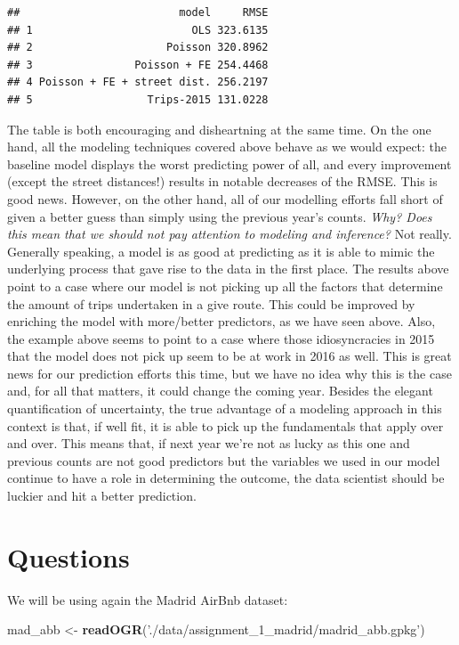 \documentclass[
]{book}
\newenvironment{Shaded}{\begin{snugshade}}{\end{snugshade}}
\newcommand{\KeywordTok}[1]{\textcolor[rgb]{0.13,0.29,0.53}{\textbf{#1}}}
\newcommand{\NormalTok}[1]{#1}
\newcommand{\StringTok}[1]{\textcolor[rgb]{0.31,0.60,0.02}{#1}}
\begin{document}
\begin{verbatim}
##                         model     RMSE
## 1                         OLS 323.6135
## 2                     Poisson 320.8962
## 3                Poisson + FE 254.4468
## 4 Poisson + FE + street dist. 256.2197
## 5                  Trips-2015 131.0228
\end{verbatim}

The table is both encouraging and disheartning at the same time. On the one hand, all the modeling techniques covered above behave as we would expect: the baseline model displays the worst predicting power of all, and every improvement (except the street distances!) results in notable decreases of the RMSE. This is good news. However, on the other hand, all of our modelling efforts fall short of given a better guess than simply using the previous year's counts. \emph{Why? Does this mean that we should not pay attention to modeling and inference?} Not really. Generally speaking, a model is as good at predicting as it is able to mimic the underlying process that gave rise to the data in the first place. The results above point to a case where our model is not picking up all the factors that determine the amount of trips undertaken in a give route. This could be improved by enriching the model with more/better predictors, as we have seen above. Also, the example above seems to point to a case where those idiosyncracies in 2015 that the model does not pick up seem to be at work in 2016 as well. This is great news for our prediction efforts this time, but we have no idea why this is the case and, for all that matters, it could change the coming year. Besides the elegant quantification of uncertainty, the true advantage of a modeling approach in this context is that, if well fit, it is able to pick up the fundamentals that apply over and over. This means that, if next year we're not as lucky as this one and previous counts are not good predictors but the variables we used in our model continue to have a role in determining the outcome, the data scientist should be luckier and hit a better prediction.

\hypertarget{questions-1}{%
\section{Questions}\label{questions-1}}

We will be using again the Madrid AirBnb dataset:

\begin{Shaded}
\begin{Highlighting}[]
\NormalTok{mad_abb <-}\StringTok{ }\KeywordTok{readOGR}\NormalTok{(}\StringTok{'./data/assignment_1_madrid/madrid_abb.gpkg'}\NormalTok{)}
\end{Highlighting}
\end{Shaded}
\end{document}
